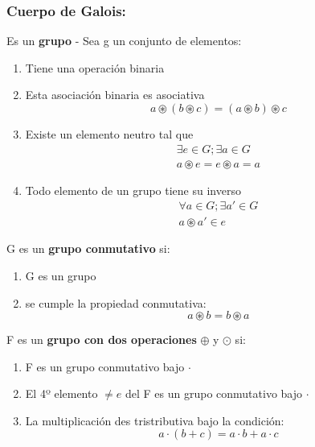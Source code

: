 \documentclass{article}
\begin{document}
\subsubsection{Cuerpo de Galois:}

Es un \textbf{grupo} - Sea g un conjunto de elementos:
\begin{enumerate}
    \item Tiene una operación binaria
    \item Esta asociación binaria es asociativa
    \begin{equation}
        a \circledast (b \circledast c) = (a \circledast b) \circledast c
    \end{equation}
    \item Existe un elemento neutro tal que
    \begin{equation}
        \begin{split}
        \exists e \in G;\exists a \in G \\
        a \circledast e= e \circledast a = a
        \end{split}
    \end{equation}
    \item Todo elemento de un grupo tiene su inverso
    \begin{equation}
        \begin{split}
            \forall a \in G; \exists a' \in G \\ 
            a \circledast a' \in e
        \end{split}
    \end{equation}
\end{enumerate}
G es un \textbf{grupo conmutativo} si:

\begin{enumerate}
    \item G es un grupo
    \item se cumple la propiedad conmutativa:
    \begin{equation}
        a \circledast b = b \circledast a
    \end{equation}
\end{enumerate}
F es un \textbf{grupo con dos operaciones} $\oplus$ y $\odot$ si:

\begin{enumerate}
    \item F es un grupo conmutativo bajo $\cdot$
    \item El 4º elemento $\neq e$ del F es un grupo conmutativo bajo $\cdot$
    \item La multiplicación des tristributiva bajo la condición:
    \begin{equation}
        a \cdot (b + c) = a \cdot b + a \cdot c
    \end{equation}
\end{enumerate}
\end{document}
